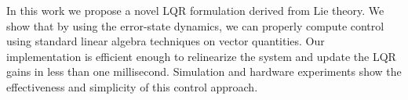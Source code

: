 

In this work we propose a novel LQR formulation derived from Lie theory. We
show that by using the error-state dynamics, we can properly compute control
using standard linear algebra techniques on vector quantities.
Our implementation is
efficient enough to relinearize the system and update the LQR gains in less than
one millisecond. Simulation and hardware experiments show the effectiveness and
simplicity of this control approach. 

